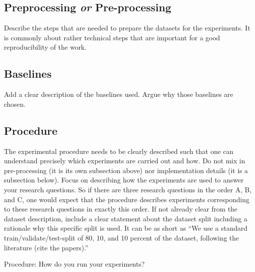 \documentclass[sigconf, review, nonacm]{acmart}
\begin{document}
\subsection{Preprocessing \textit{or} Pre-processing}
\label{sec:preprocessing}

Describe the steps that are needed to prepare the datasets for the experiments.
It is commonly about rather technical steps that are important for a good reproducibility of the work.

\subsection{Baselines}

Add a clear description of the baselines used.
Argue why those baselines are chosen.

\subsection{Procedure}
\label{sec:procedure}

\begin{tcolorbox}
    [title=Procedure: What needs to be described to understand the experiments.]
    The experimental procedure needs to be clearly described such that one can understand precisely which experiments are carried out and how. 
    Do not mix in pre-processing (it is its own subsection above) nor implementation details (it is a subsection below). 
    Focus on describing how the experiments are used to answer your research questions. 
    So if there are three research questions in the order A, B, and C, one would expect that the procedure describes experiments corresponding to these research questions in exactly this order. 
    If not already clear from the dataset description, include a clear statement about the dataset split including a rationale why this specific split is used. 
    It can be as short as ``We use a standard train/validate/test-split of 80, 10, and 10 percent of the dataset, following the literature (cite the papers).''

\end{tcolorbox}


Procedure: How do you run your experiments?
\end{document}
